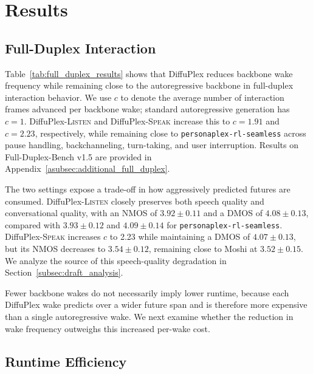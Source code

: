 \section{Results}
\label{sec:results}



\subsection{Full-Duplex Interaction}
\label{subsec:full_duplex_results}

Table~\ref{tab:full_duplex_results} shows that DiffuPlex reduces backbone wake frequency while remaining close to the autoregressive backbone in full-duplex interaction behavior.
We use $c$ to denote the average number of interaction frames advanced per backbone wake; standard autoregressive generation has $c=1$.
DiffuPlex-\textsc{Listen} and DiffuPlex-\textsc{Speak} increase this to $c=1.91$ and $c=2.23$, respectively, while remaining close to \texttt{personaplex-rl-seamless} across pause handling, backchanneling, turn-taking, and user interruption.
Results on Full-Duplex-Bench v1.5 are provided in Appendix~\ref{asubsec:additional_full_duplex}.

The two settings expose a trade-off in how aggressively predicted futures are consumed.
DiffuPlex-\textsc{Listen} closely preserves both speech quality and conversational quality, with an NMOS of $3.92\pm0.11$ and a DMOS of $4.08\pm0.13$, compared with $3.93\pm0.12$ and $4.09\pm0.14$ for \texttt{personaplex-rl-seamless}.
DiffuPlex-\textsc{Speak} increases $c$ to 2.23 while maintaining a DMOS of
$4.07\pm0.13$, but its NMOS decreases to $3.54\pm0.12$, remaining close to Moshi at
$3.52\pm0.15$.
We analyze the source of this speech-quality degradation in Section~\ref{subsec:draft_analysis}.

Fewer backbone wakes do not necessarily imply lower runtime, because each DiffuPlex wake predicts over a wider future span and is therefore more expensive than a single autoregressive wake.
We next examine whether the reduction in wake frequency outweighs this increased per-wake cost.



\subsection{Runtime Efficiency}
\label{subsec:runtime_results}

